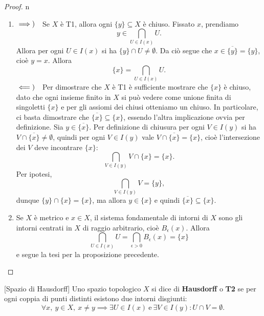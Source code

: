 \begin{proof}{n}~{}
\begin{enumerate}[label=\Roman*]
\item $\implies)\quad$Se $X$ è T1, allora ogni $\{y\}\subseteq X$ è chiuso. Fissato $x$, prendiamo
\begin{equation*}
	 y \in \bigcap_{U\in I\left(x\right)}U.
\end{equation*}
Allora per ogni $U\in I\left(x\right)$ si ha $\{y\}\cap U\neq \emptyset$. Da ciò segue che $x\in\overline{\{y\}}=\{y\}$, cioè $y=x$. Allora \begin{equation*}
	\{x\}=\bigcap_{U\in I\left(x\right)}U.
\end{equation*}
$\impliedby)\quad$Per dimostrare che $X$ è T1 è sufficiente mostrare che $\{x\}$ è chiuso, dato che ogni insieme finito in $X$ si può vedere come unione finita di singoletti $\{x\}$ e per gli assiomi dei chiusi otteniamo un chiuso. In particolare, ci basta dimostrare che $\overline{\{x\}}\subseteq \{x\}$, essendo l'altra implicazione ovvia per definizione. Sia $y\in\overline{\{x\}}$. Per definizione di chiusura per ogni $V\in I\left(y\right)$ si ha $V\cap\overline{\{x\}}\neq\emptyset$, quindi per ogni  $V\in I\left(y\right)$ vale $V\cap\overline{\{x\}}=\{x\}$, cioè l'intersezione dei $V$ deve incontrare $\{x\}$:
\begin{equation*}
\bigcap_{V\in I\left(y\right)}V\cap\{x\}=\{x\}.
\end{equation*}
Per ipotesi,
\begin{equation*}
	\bigcap_{V\in I\left(y\right)}V=\{y\},
\end{equation*}
dunque $\{y\}\cap \{x\}=\{x\}$, ma allora $y\in\{x\}$ e quindi $\overline{\{x\}}\subseteq \{x\}$.
\item Se $X$ è metrico e $x\in X$, il sistema fondamentale di intorni di $X$ sono gli intorni centrati in $X$ di raggio arbitrario, cioè $B_{\epsilon}\left(x\right)$. Allora
\begin{equation*}
\bigcap_{U\in I\left(x\right)}U=\bigcap_{\epsilon > 0}B_{\epsilon}\left(x\right)=\{x\}
\end{equation*}
e segue la tesi per la proposizione precedente.
\end{enumerate}
\end{proof}
\begin{definition}{}[Spazio di Hausdorff]
Uno spazio topologico $X$ si dice di \textbf{Hausdorff} o \textbf{T2} se per ogni coppia di punti distinti esistono due intorni disgiunti:
\begin{equation*}
	\forall x,\ y\in X,\ x\neq y\implies \exists U\in I\left(x\right)\ \text{e}\ \exists V\in I\left(y\right)\colon U\cap V=\emptyset.
\end{equation*}
\end{definition}
